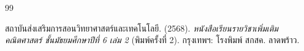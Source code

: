 \documentclass[a4paper,oneside,12pt]{book}
\begin{document}
	\frontmatter
	\tableofcontents
	\clearpage
	
	\mainmatter
		
		


\clearpage


\begingroup

\setcounter{chapter}{0}

\renewcommand{\bibname}{บรรณานุกรม}

\begin{thebibliography}{99}
	
สถาบันส่งเสริมการสอนวิทยาศาสตร์และเทคโนโลยี. (2568).
\textit{หนังสือเรียนรายวิชาเพิ่มเติมคณิตศาสตร์ ชั้นมัธยมศึกษาปีที่ 6 เล่ม 2} (พิมพ์ครั้งที่ 2).
กรุงเทพฯ: โรงพิมพ์ สกสค. ลาดพร้าว.
	
\end{thebibliography}

\endgroup
\end{document}
